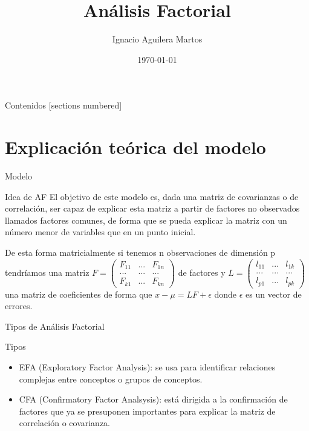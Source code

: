 \documentclass[10pt]{beamer}
\title{Análisis Factorial}
\author{Ignacio Aguilera Martos}
\date{\today}
\institute{Estadística Multivariante \\ \href{https://github.com/nacheteam/Analisis-Factorial}{Link: \underline{Documentos LaTeX en GitHub}}}
\begin{document}
\maketitle

\begin{frame}[fragile]{Contenidos}
  [sections numbered]
  \tableofcontents[hideallsubsections]
\end{frame}


\section{Explicación teórica del modelo}

\begin{frame}[fragile]{Modelo}
	\vspace{10px}
	\begin{alertblock}{Idea de AF}
		El objetivo de este modelo es, dada una matriz de covarianzas o de correlación, ser capaz de explicar esta matriz a partir de factores no observados llamados factores comunes, de forma que se pueda explicar la matriz con un número menor de variables que en un punto inicial.
	\end{alertblock}
	De esta forma matricialmente si tenemos n observaciones de dimensión p tendríamos una matriz
	$F=
	\begin{pmatrix}
	F_{11} & ... & F_{1n} \\
	... & ... & ... \\
	F_{k1} & ... & F_{kn}
	\end{pmatrix}
	$ de factores y 
	$L=
	\begin{pmatrix}
	l_{11} & ... & l_{1k} \\
	... & ... & ... \\
	l_{p1} & ... & l_{pk}	
	\end{pmatrix}
	$ una matriz de coeficientes de forma que $x-\mu = LF + \epsilon$ donde $\epsilon$ es un vector de errores.
\end{frame}

\begin{frame}[fragile]{Tipos de Análisis Factorial}
\vspace{10px}
\begin{block}{Tipos}
	\begin{itemize}
		\item EFA (Exploratory Factor Analysis): se usa para identificar relaciones complejas entre conceptos o grupos de conceptos.
		\item CFA (Confirmatory Factor Analsysis): está dirigida a la confirmación de factores que ya se presuponen importantes para explicar la matriz de correlación o covarianza.
	\end{itemize}
\end{block}
\end{frame}
\end{document}
